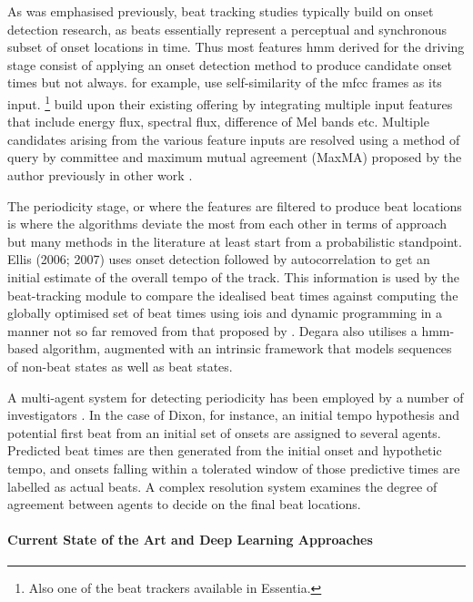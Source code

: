 {As was emphasised previously, beat tracking studies typically build on onset detection research, as beats essentially represent a perceptual and synchronous subset of onset locations in time. Thus most features \acrshort{hmm} derived for the driving stage consist of applying an onset detection method to produce candidate onset times \citep{Brossier2006, Dixon2006, Ellis2007a, Degara2012, Zapata2014} but not always. \cite{antonopoulos2007self} for example, use self-similarity of the \acrshort{mfcc} frames as its input. \cite{Degara2012}\footnote{Also one of the beat trackers available in Essentia.} build upon their existing offering by integrating multiple input features that include energy flux, spectral flux, difference of Mel bands etc. Multiple candidates arising from the various feature inputs are resolved using a method of query by committee and maximum mutual agreement (MaxMA) proposed by the author previously in other work \citep{Zapata2012, Zapata2014}.

The periodicity stage, or where the features are filtered to produce beat locations is where the algorithms deviate the most from each other in terms of approach but many methods in the literature at least start from a probabilistic standpoint. Ellis (2006; 2007) uses onset detection followed by autocorrelation to get an initial estimate of the overall tempo of the track. This information is used by the beat-tracking module to compare the idealised beat times against computing the globally optimised set of beat times using \acrshort{ioi}s and dynamic programming in a manner not so far removed from that proposed by \cite{Alonso2007}. Degara also utilises a \acrshort{hmm}-based algorithm, augmented with an intrinsic framework that models sequences of non-beat states as well as beat states.

A multi-agent system for detecting periodicity has been employed by a number of investigators \citep{Goto2001a, Dixon2007, Oliveira2012}. In the case of Dixon, for instance, an initial tempo hypothesis and potential first beat from an initial set of onsets are assigned to several agents. Predicted beat times are then generated from the initial onset and hypothetic tempo, and onsets falling within a tolerated window of those predictive times are labelled as actual beats. A complex resolution system examines the degree of agreement between agents to decide on the final beat locations.

\paragraph{Current State of the Art and Deep Learning Approaches}

}
